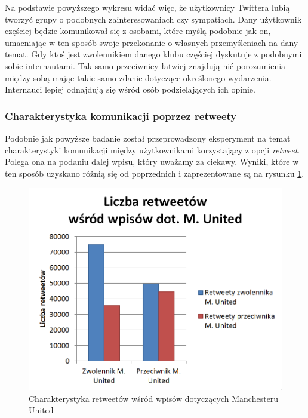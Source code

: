 Na podstawie powyższego wykresu widać więc, że użytkownicy Twittera lubią 
tworzyć grupy o podobnych zainteresowaniach czy sympatiach. Dany użytkownik
częściej będzie komunikował się z osobami, które myślą podobnie jak on,
umacniając w ten sposób swoje przekonanie o własnych przemyśleniach na dany temat.
Gdy ktoś jest zwolennikiem danego klubu częściej dyskutuje z podobnymi sobie
internautami. Tak samo przeciwnicy łatwiej znajdują nić porozumienia między sobą
mając takie samo zdanie dotyczące określonego wydarzenia. Internauci lepiej
odnajdują się wśród osób podzielających ich opinie.  









\subsubsection{Charakterystyka komunikacji poprzez retweety}
Podobnie jak powyższe badanie został przeprowadzony eksperyment na temat 
charakterystyki komunikacji między użytkownikami korzystający z opcji 
\textit{retweet}. Polega ona na podaniu dalej wpisu, który uważamy za ciekawy.
Wyniki, które w ten sposób uzyskano różnią się od poprzednich i zaprezentowane
są na rysunku \ref{image:retweety-munited}.

\begin{figure}[ht!]
\centering
\includegraphics[width=120mm]{img/retweety-munited.png}
\caption{Charakterystyka retweetów wśród wpisów dotyczących Manchesteru United}
\label{image:retweety-munited}
\end{figure}



